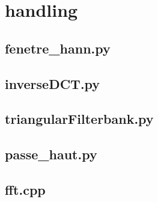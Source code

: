 \chapter{handling}
	\section{fenetre_hann.py}
	
	
	\section{inverseDCT.py}
	
	
	\section{triangularFilterbank.py}
	
	
	\section{passe_haut.py}
	
	
	\section{fft.cpp}
	